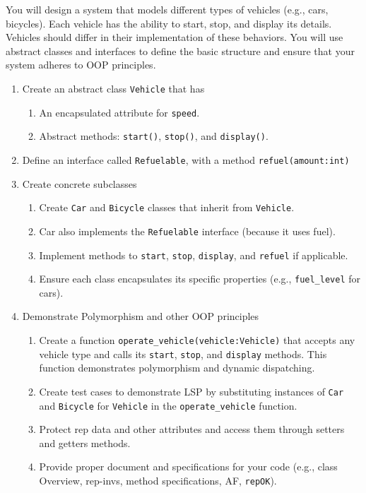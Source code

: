 \documentclass[oneside,11pt,dvipsnames]{book}
\newcommand{\code}[1]{\texttt{#1}}
\begin{document}
You will design a system that models different types of vehicles (e.g., cars, bicycles). Each vehicle has the ability to start, stop, and display its details. Vehicles should differ in their implementation of these behaviors. You will use abstract classes and interfaces to define the basic structure and ensure that your system adheres to OOP principles.

\begin{enumerate}
    \item Create an abstract class \code{Vehicle} that has
    \begin{enumerate}
        \item An encapsulated attribute for \code{speed}.
        \item Abstract methods: \code{start()}, \code{stop()}, and \code{display()}.
    \end{enumerate}
    \item Define an interface called \code{Refuelable}, with a method \code{refuel(amount:int)}
    \item Create concrete subclasses
    \begin{enumerate}
	    \item Create \code{Car} and \code{Bicycle} classes that inherit from \code{Vehicle}.
	    \item Car also implements the \code{Refuelable} interface (because it uses fuel).
	    \item Implement methods to \code{start}, \code{stop}, \code{display}, and \code{refuel} if applicable.
	    \item Ensure each class encapsulates its specific properties (e.g., \code{fuel\_level} for cars).
    \end{enumerate}
    \item Demonstrate Polymorphism and other OOP principles
    \begin{enumerate}
        \item Create a function \code{operate\_vehicle(vehicle:Vehicle)} that accepts any vehicle type and calls its \code{start}, \code{stop}, and \code{display} methods. This function demonstrates polymorphism and dynamic dispatching.
        \item Create test cases to demonstrate LSP by substituting instances of \code{Car} and \code{Bicycle} for \code{Vehicle} in the \code{operate\_vehicle} function. 
        \item Protect rep data and other attributes and access them through setters and getters methods.
    \item Provide proper document and specifications for your code (e.g., class Overview, rep-invs, method specifications, AF, \code{repOK}).
    \end{enumerate}

\end{enumerate}
\end{document}
